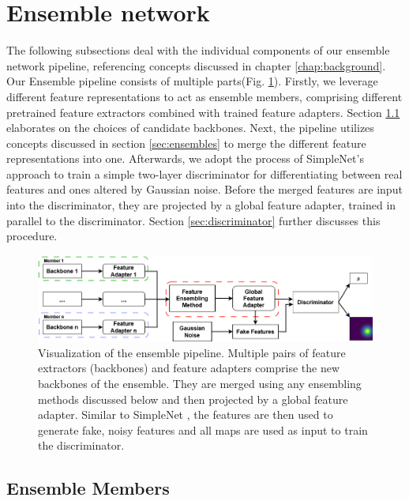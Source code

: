 \section{Ensemble network}
\label{sec:ourensemblenetwork}


The following subsections deal with the individual components of our ensemble network pipeline, referencing concepts discussed in chapter \ref{chap:background}. Our Ensemble pipeline 
consists of multiple parts(Fig. \ref{fig:ensemblepipeline}). Firstly, we leverage different feature representations to act as ensemble members, comprising 
different pretrained feature extractors combined with trained feature adapters. Section \ref{sec:ensemblecandidates} elaborates on the choices of candidate backbones. Next, the pipeline 
utilizes concepts discussed in section \ref{sec:ensembles} to merge the different feature representations into one. Afterwards, we adopt the process of SimpleNet's \cite{liu2023simplenet} 
approach to train a simple two-layer discriminator for differentiating between real features and ones altered by Gaussian noise. Before the merged features are input into the 
discriminator, they are projected by a global feature adapter, trained in parallel to the discriminator. Section \ref{sec:discriminator} further discusses this procedure.

\begin{figure}[htbp]
    \centering
    \includegraphics[width=\textwidth]{figures/ensemblepipeline.png}
    \caption{Visualization of the ensemble pipeline. Multiple pairs of feature extractors (backbones) and feature adapters comprise the new backbones of the ensemble. They are 
            merged using any ensembling methods discussed below and then projected by a global feature adapter. Similar to SimpleNet \cite{liu2023simplenet}, the 
            features are then used to generate fake, noisy features and all maps are used as input to train the discriminator.}
    \label{fig:ensemblepipeline}
\end{figure}


\subsection{Ensemble Members}
\label{sec:ensemblecandidates}

